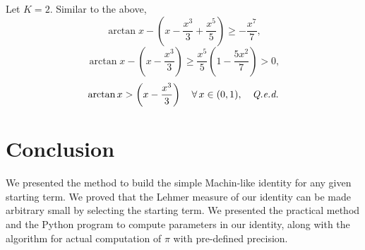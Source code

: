 \documentclass[draft, 11pt]{article} %
\begin{document}
Let $K=2$. Similar to the above,
$$
\arctan x - \left( x - \dfrac{x^3}{3} + \dfrac{x^5}{5} \right) \ge -\dfrac{x^7}{7},
$$
$$
\arctan x - \left( x - \dfrac{x^3}{3} \right) \ge
    \dfrac{x^5}{5} \left( 1 - \dfrac{5x^2}{7} \right) > 0,
$$
$$
\arctan x > \left( x - \dfrac{x^3}{3} \right) \quad \forall\, x \in (0,1),
    \quad\hbox{\qed}
$$

\section{Conclusion}

We presented the method to build the simple Machin-like identity for any given
starting term. We proved that the Lehmer measure of our identity can be made
arbitrary small by selecting the starting term. We presented the practical method and
the Python program to compute parameters in our identity, along with the algorithm
for actual computation of $\pi$ with pre-defined precision.
 
%
%
%
\end{document}
